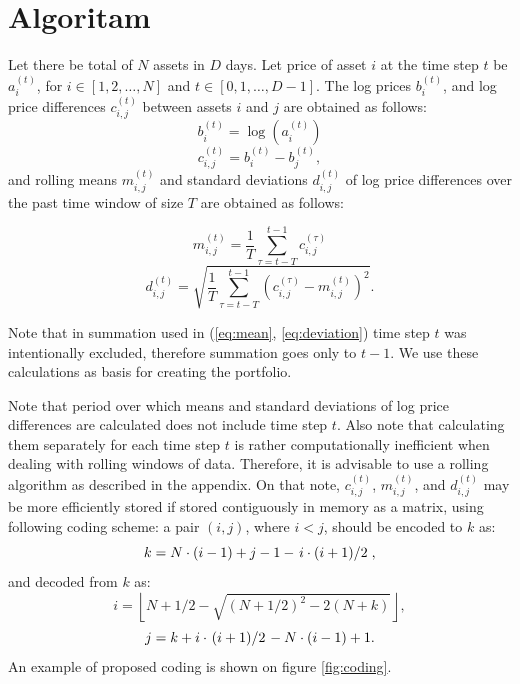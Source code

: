 \documentclass[lmodern, utf8, diplomski]{fer}
\begin{document}
  
\chapter{Algoritam}

  Let there be total of $N$ assets in $D$ days.
  Let price of asset $i$ at the time step $t$ be $a_i^{(t)}$, for $i \in {\left[1, 2, \ldots, N\right]}$ and $t \in {\left[0, 1, \ldots, D-1\right]}$.
  The log prices $b_i^{(t)}$, and log price differences $c_{i,j}^{(t)}$ between assets $i$ and $j$ are obtained as follows:
  \begin{equation} b_i^{(t)} = \log\left(a_i^{(t)}\right) \end{equation}
  \begin{equation} c_{i,j}^{(t)} = b_i^{(t)} - b_j^{(t)}, \end{equation}
  and rolling means $m_{i,j}^{(t)}$ and standard deviations $d_{i,j}^{(t)}$ of log price differences over the past time window of size $T$ are obtained as follows:
  
  \begin{equation}
  \label{eq:mean}
  m_{i,j}^{(t)} = \frac{1}{T}\sum_{\tau = t - T}^{t - 1} c_{i,j}^{(\tau)}
  \end{equation}
  \begin{equation}
  \label{eq:deviation}
  d_{i,j}^{(t)} = \sqrt{\frac{1}{T}\sum_{\tau=t - T}^{t - 1} \left(c_{i,j}^{(\tau)} - m_{i,j}^{(t)} \right)^2}.
  \end{equation}
  
  Note that in summation used in (\ref{eq:mean}, \ref{eq:deviation}) time step $t$ was intentionally excluded, therefore summation goes only to $t - 1$.
  We use these calculations as basis for creating the portfolio.

  Note that period over which means and standard deviations of log price differences are calculated does not include time step $t$.
  Also note that calculating them separately for each time step $t$ is rather computationally inefficient when dealing with rolling windows of data.
  Therefore, it is advisable to use a rolling algorithm as described in the appendix.
  On that note, $c_{i,j}^{(t)}$, $m_{i,j}^{(t)}$, and $d_{i,j}^{(t)}$ may be more efficiently stored if stored contiguously in memory as a matrix, using following coding scheme: a pair $(i, j)$, where $i < j$, should be encoded to $k$ as:
  \begin{equation} k = N \cdot (i - 1) + j - 1 - \left. i \cdot (i + 1) \middle/ 2\right., \end{equation}
  and decoded from $k$ as:
  \begin{equation} i = \left\lfloor N + 1/2 - \sqrt{(N + 1/2)^2 - 2(N + k)} \right\rfloor, \end{equation}
  \begin{equation} j = k + i \cdot \left.(i + 1) \middle/ 2\right. - N \cdot (i - 1) + 1. \end{equation}
  An example of proposed coding is shown on figure \ref{fig:coding}.
  
\end{document}
